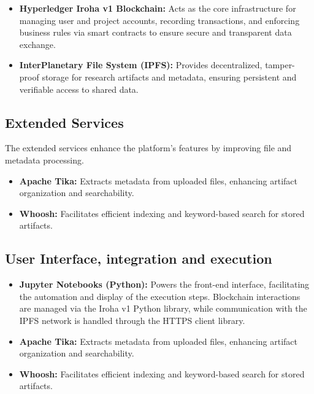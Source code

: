 \documentclass{article}
\begin{document}
\begin{itemize}
      \item \textbf{Hyperledger Iroha v1 Blockchain:} Acts as the core infrastructure for managing user and project accounts, recording transactions, and enforcing business rules via smart contracts to ensure secure and transparent data exchange.
      \item \textbf{InterPlanetary File System (IPFS):} Provides decentralized, tamper-proof storage for research artifacts and metadata, ensuring persistent and verifiable access to shared data.
\end{itemize}

\subsection{Extended Services}

The extended services enhance the platform's features by improving file and metadata processing.

\begin{itemize}
      \item \textbf{Apache Tika:} Extracts metadata from uploaded files, enhancing artifact organization and searchability.
      \item \textbf{Whoosh:} Facilitates efficient indexing and keyword-based search for stored artifacts.
\end{itemize}


\subsection{User Interface, integration and execution}

\begin{itemize}
      \item \textbf{Jupyter Notebooks (Python):} Powers the front-end interface, facilitating the automation and display of the execution steps. Blockchain interactions are managed via the Iroha v1 Python library, while communication with the IPFS network is handled through the HTTPS client library.
      \item \textbf{Apache Tika:} Extracts metadata from uploaded files, enhancing artifact organization and searchability.
      \item \textbf{Whoosh:} Facilitates efficient indexing and keyword-based search for stored artifacts.
\end{itemize}
\end{document}
